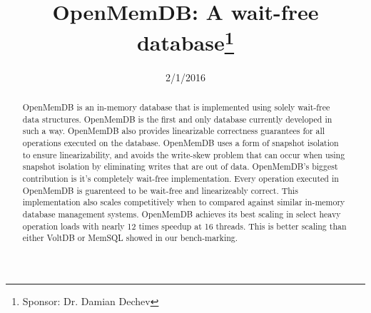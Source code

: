 \documentclass[conference, compsoc]{IEEEtran}
\begin{document}
\title{OpenMemDB: A wait-free database\thanks{Sponsor: Dr. Damian Dechev}}
\author{
 \and 
{} \and 
{} \and 
{}
}

\date{2/1/2016}

\maketitle
\newpage

\begin{abstract}
OpenMemDB is an in-memory database that is implemented using solely wait-free
data structures. OpenMemDB is the first and only database currently developed in such a
way. OpenMemDB also provides linearizable correctness guarantees for all operations
executed on the database. OpenMemDB uses a form of snapshot isolation to ensure 
linearizability, and avoids the write-skew problem that can occur when using
snapshot isolation by eliminating writes that are out of data. 
OpenMemDB's biggest contribution is it's completely wait-free 
implementation. Every operation executed in OpenMemDB is guarenteed to be wait-free 
and linearizeably correct. This implementation also scales competitively when to compared 
against similar in-memory database management systems.
OpenMemDB achieves its best scaling in select heavy operation loads with nearly 
12 times speedup at 16 threads. This is better scaling than either VoltDB or MemSQL showed
in our bench-marking. 
\end{abstract}
\end{document}
